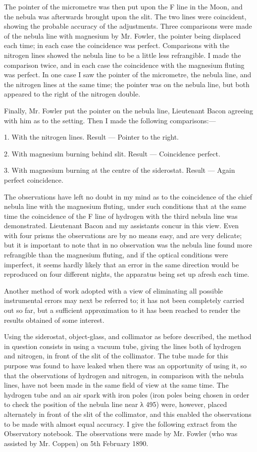 \documentclass[a4paper, 12pt, oneside, polutonikogreek, english]{article}
\begin{document}
The pointer of the micrometre was then put upon the F line in the Moon, and the nebula was afterwards brought upon the slit. The two lines were coincident, showing the probable accuracy of the adjustments. Three comparisons were made of the nebula line with magnesium by Mr. Fowler, the pointer being displaced each time; in each case the coincidence was perfect. Comparisons with the nitrogen lines showed the nebula line to be a little less refrangible. I made the comparison twice, and in each case the coincidence with the magnesium fluting was perfect. In one case I saw the pointer of the micrometre, the nebula line, and the nitrogen lines at the same time; the pointer was on the nebula line, but both appeared to the right of the nitrogen double.

Finally, Mr. Fowler put the pointer on the nebula line, Lieutenant Bacon agreeing with him as to the setting. Then I made the following comparisons:---

1. With the nitrogen lines. Result --- Pointer to the right.

2. With magnesium burning behind slit. Result --- Coincidence perfect.

3. With magnesium burning at the centre of the siderostat. Result --- Again perfect coincidence.

The observations have left no doubt in my mind as to the coincidence of the chief nebula line with the magnesium fluting, under such conditions that at the same time the coincidence of the F line of hydrogen with the third nebula line was demonstrated. Lieutenant Bacon and my assistants concur in this view. Even with four prisms the observations are by no means easy, and are very delicate; but it is important to note that in no observation was the nebula line found more refrangible than the magnesium fluting, and if the optical conditions were imperfect, it seems hardly likely that an error in the same direction would be reproduced on four different nights, the apparatus being set up afresh each time.

Another method of work adopted with a view of eliminating all possible instrumental errors may next be referred to; it has not been completely carried out so far, but a sufficient approximation to it has been reached to render the results obtained of some interest.

Using the siderostat, object-glass, and collimator as before described, the method in question consists in using a vacuum tube, giving the lines both of hydrogen and nitrogen, in front of the slit of the collimator. The tube made for this purpose was found to have leaked when there was an opportunity of using it, so that the observations of hydrogen and nitrogen, in comparison with the nebula lines, have not been made in the same field of view at the same time. The hydrogen tube and an air spark with iron poles (iron poles being chosen in order to check the position of the nebula line near λ 495) were, however, placed alternately in front of the slit of the collimator, and this enabled the observations to be made with almost equal accuracy. I give the following extract from the Observatory notebook. The observations were made by Mr. Fowler (who was assisted by Mr. Coppen) on 5th February 1890.
\end{document}
